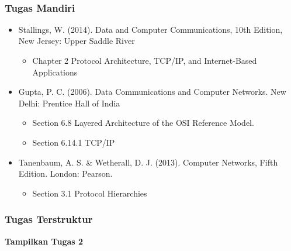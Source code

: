 \documentclass[pdflatex,compress]{beamer}
\begin{document}
\begin{frame}
	\
\end{frame}

\begin{frame}
	\frametitle{Tugas Mandiri}
	\begin{itemize}
		\item Stallings, W. (2014). Data and Computer Communications, 10th Edition, New Jersey: Upper Saddle River\\
		\begin{itemize}
			\item Chapter 2 Protocol Architecture, TCP/IP, and Internet-Based Applications
		\end{itemize}
		\item Gupta, P. C. (2006). Data Communications and Computer Networks. New Delhi: Prentice Hall of India\\
		\begin{itemize}
			\item Section 6.8 Layered Architecture of the OSI Reference Model.
			\item Section 6.14.1 TCP/IP
		\end{itemize}
		\item Tanenbaum, A. S. \& Wetherall, D. J. (2013). Computer Networks, Fifth Edition. London: Pearson.\\
		\begin{itemize}
			\item Section 3.1 Protocol Hierarchies
		\end{itemize}
	\end{itemize}
\end{frame}

\begin{frame}
	\frametitle{Tugas Terstruktur}
	\textbf{Tampilkan Tugas 2}
\end{frame}
\end{document}
